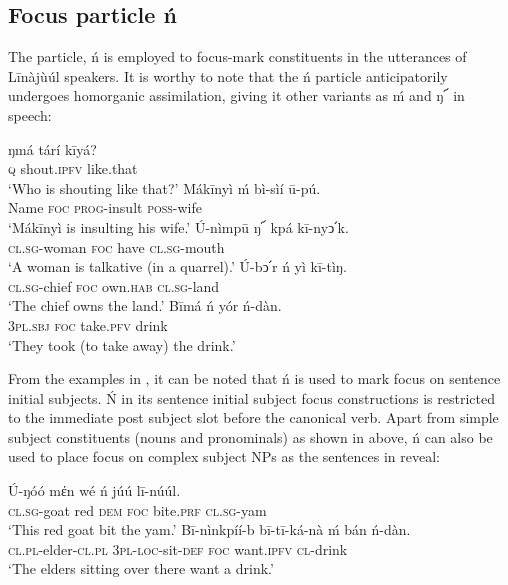 \documentclass[output=paper,colorlinks,citecolor=brown]{langscibook}
\begin{document}
\subsection{Focus particle ń }\label{sec:bisilki:5.1}

The particle, ń is employed to focus-mark constituents in the utterances of Līnàjùúl speakers. It is worthy to note that the ń particle anticipatorily undergoes homorganic assimilation, giving it other variants as ḿ and ŋ՜ in speech:

\ea%
    \label{ex:bisilki:8}
    \ea\label{ex:bisilki:8a}
        \ea\label{ex:bisilki:8ai}
        \gll    ŋmá	tárí		kīyá?\\
                \textsc{q}	shout\textsc{.ipfv}	like.that\\
        \glt    ‘Who is shouting like that?’
        \ex\label{ex:bisilki:8aii}
        \gll    Mákīnyì	ḿ	bì-sìí		ū-pú.\\
                Name		\textsc{foc}	\textsc{prog-}insult	\textsc{poss-}wife\\
        \glt    ‘Mákīnyì is insulting his wife.’
        \z
    \ex\label{ex:bisilki:8b}
    \gll    Ú-nìmpū		ŋ՜	kpá	kī-nyↄ՛k.\\
            \textsc{cl.sg-}woman	\textsc{foc}	have	\textsc{cl.sg-}mouth\\
    \glt    ‘A woman is talkative (in a quarrel).’
    \ex\label{ex:bisilki:8c}
    \gll    Ú-bↄ՛r		ń	yì		kī-tìŋ.\\
            \textsc{cl.sg-}chief	\textsc{foc}	own\textsc{.hab}	\textsc{cl.sg-}land\\
    \glt    ‘The chief owns the land.’
    \ex\label{ex:bisilki:8d}
    \gll    Bīmá		ń	yór		ń-dàn.\\
            \textsc{3pl.sbj}	\textsc{foc}	take\textsc{.pfv}	drink\\
    \glt    ‘They took (to take away) the drink.’
    \z
\z

From the examples in , it can be noted that ń is used to mark focus on sentence initial subjects. Ń in its sentence initial subject focus constructions is restricted to the immediate post subject slot before the canonical verb. Apart from simple subject constituents (nouns and pronominals) as shown in  above, ń can also be used to place focus on complex subject NPs as the sentences in  reveal:

\ea%
    \label{ex:bisilki:9}
    \ea\label{ex:bisilki:9a}
    \gll    Ú-ŋóó	mέn		wé	ń	júú		lī-núúl.\\
            \textsc{cl.sg-}goat	red	\textsc{dem}	\textsc{foc}	bite\textsc{.prf}	\textsc{cl.sg-}yam\\
    \glt    ‘This red goat bit the yam.’
    \ex\label{ex:bisilki:9b}
    \gll    Bī-nìnkpíí-b	         bī-tī-ká-nà	    ḿ           bán	 ń-dàn.\\
            \textsc{cl.pl-}elder\textsc{-cl.pl}   \textsc{3pl-loc-}sit\textsc{-def}	   \textsc{foc}	      want\textsc{.ipfv}	 \textsc{cl-}drink\\
    \glt    ‘The elders sitting over there want a drink.’
    \z
\z
\end{document}
